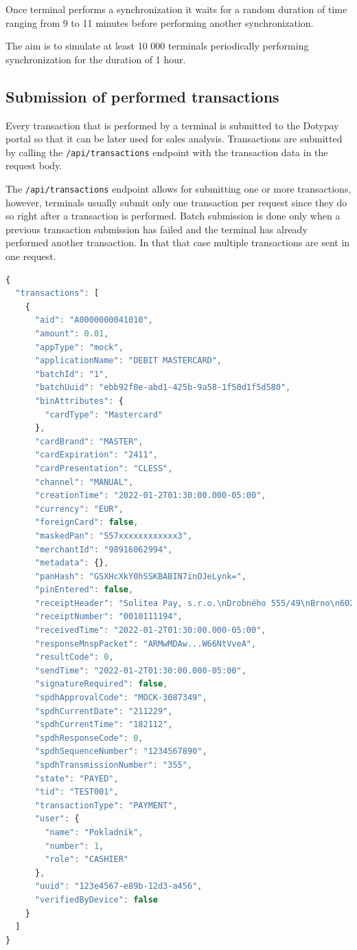 \documentclass[12pt, a4paper]{article}
\begin{document}
Once terminal performs a synchronization it waits for a random duration of time ranging from 9 to 11 minutes before performing another synchronization.

The aim is to simulate at least 10 000 terminals periodically performing synchronization for the duration of 1 hour.

\subsection{Submission of performed transactions}

Every transaction that is performed by a terminal is submitted to the Dotypay portal so that it can be later used for sales analysis.
Transactions are submitted by calling the \texttt{/api/transactions} endpoint with the transaction data in the request body.

The \texttt{/api/transactions} endpoint allows for submitting one or more transactions, however, terminals usually submit only one transaction per request since they do so right after a transaction is performed.
Batch submission is done only when a previous transaction submission has failed and the terminal has already performed another transaction.
In that that case multiple transactions are sent in one request.

\begin{lstlisting}[language=JavaScript, caption={Transaction submission request body},captionpos=b, basicstyle=\tiny]
{
  "transactions": [
    {
      "aid": "A0000000041010",
      "amount": 0.01,
      "appType": "mock",
      "applicationName": "DEBIT MASTERCARD",
      "batchId": "1",
      "batchUuid": "ebb92f0e-abd1-425b-9a58-1f50d1f5d580",
      "binAttributes": {
        "cardType": "Mastercard"
      },
      "cardBrand": "MASTER",
      "cardExpiration": "2411",
      "cardPresentation": "CLESS",
      "channel": "MANUAL",
      "creationTime": "2022-01-2T01:30:00.000-05:00",
      "currency": "EUR",
      "foreignCard": false,
      "maskedPan": "557xxxxxxxxxxxx3",
      "merchantId": "98916062994",
      "metadata": {},
      "panHash": "GSXHcXkY0hSSKBABIN7inOJeLynk=",
      "pinEntered": false,
      "receiptHeader": "Solitea Pay, s.r.o.\nDrobného 555/49\nBrno\n60200\nIČO: 25595091\nTID: TEST001   ",
      "receiptNumber": "0010111194",
      "receivedTime": "2022-01-2T01:30:00.000-05:00",
      "responseMnspPacket": "ARMwMDAw...W66NtVveA",
      "resultCode": 0,
      "sendTime": "2022-01-2T01:30:00.000-05:00",
      "signatureRequired": false,
      "spdhApprovalCode": "MOCK-3087349",
      "spdhCurrentDate": "211229",
      "spdhCurrentTime": "182112",
      "spdhResponseCode": 0,
      "spdhSequenceNumber": "1234567890",
      "spdhTransmissionNumber": "355",
      "state": "PAYED",
      "tid": "TEST001",
      "transactionType": "PAYMENT",
      "user": {
        "name": "Pokladník",
        "number": 1,
        "role": "CASHIER"
      },
      "uuid": "123e4567-e89b-12d3-a456",
      "verifiedByDevice": false
    }
  ]
}
\end{lstlisting}
\end{document}
